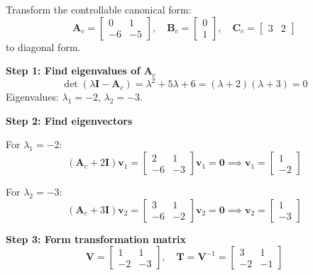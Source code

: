 \begin{example}
\label{ex:ccf_to_diagonal}
Transform the controllable canonical form:
\begin{equation}
\mathbf{A}_c = \begin{bmatrix} 0 & 1 \\ -6 & -5 \end{bmatrix}, \quad \mathbf{B}_c = \begin{bmatrix} 0 \\ 1 \end{bmatrix}, \quad \mathbf{C}_c = \begin{bmatrix} 3 & 2 \end{bmatrix}
\end{equation}
to diagonal form.

\textbf{Step 1: Find eigenvalues of $\mathbf{A}_c$}
\begin{equation}
\det(\lambda\mathbf{I} - \mathbf{A}_c) = \lambda^2 + 5\lambda + 6 = (\lambda + 2)(\lambda + 3) = 0
\end{equation}
Eigenvalues: $\lambda_1 = -2$, $\lambda_2 = -3$.

\textbf{Step 2: Find eigenvectors}

For $\lambda_1 = -2$:
\begin{equation}
(\mathbf{A}_c + 2\mathbf{I})\mathbf{v}_1 = \begin{bmatrix} 2 & 1 \\ -6 & -3 \end{bmatrix}\mathbf{v}_1 = \mathbf{0} \implies \mathbf{v}_1 = \begin{bmatrix} 1 \\ -2 \end{bmatrix}
\end{equation}

For $\lambda_2 = -3$:
\begin{equation}
(\mathbf{A}_c + 3\mathbf{I})\mathbf{v}_2 = \begin{bmatrix} 3 & 1 \\ -6 & -2 \end{bmatrix}\mathbf{v}_2 = \mathbf{0} \implies \mathbf{v}_2 = \begin{bmatrix} 1 \\ -3 \end{bmatrix}
\end{equation}

\textbf{Step 3: Form transformation matrix}
\begin{equation}
\mathbf{V} = \begin{bmatrix} 1 & 1 \\ -2 & -3 \end{bmatrix}, \quad \mathbf{T} = \mathbf{V}^{-1} = \begin{bmatrix} 3 & 1 \\ -2 & -1 \end{bmatrix}
\end{equation}


\end{example}
